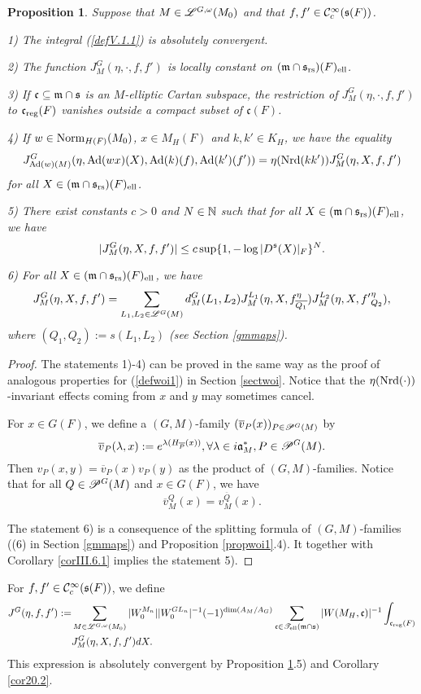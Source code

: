 \documentclass[a4paper]{amsart}
\newcommand{\fa}{{\mathfrak{a}}} \newcommand{\fb}{{\mathfrak{b}}}\newcommand{\fc}{{\mathfrak{c}}} \newcommand{\fd}{{\mathfrak{d}}}
\newcommand{\fm}{{\mathfrak{m}}} \newcommand{\fn}{{\mathfrak{n}}}\newcommand{\fo}{{\mathfrak{o}}} \newcommand{\fp}{{\mathfrak{p}}}
\newcommand{\ov}{\overline}
\newtheorem{prop}[thm]{Proposition}
\theoremstyle{definition}
\theoremstyle{remark}
\numberwithin{equation}{subsection}
\begin{document}
\begin{prop}\label{propV.1.1}
Suppose that $M\in\mathscr{L}^{G,\omega}(M_0)$ and that $f,f'\in{\mathcal {C}}_c^\infty({\mathfrak{s}}(F))$. 

1) The integral (\ref{defV.1.1}) is absolutely convergent. 

2) The function $J_M^G(\eta, \cdot, f, f')$ is locally constant on $(\fm\cap\fs_\rs)(F)_\el$. 

3) If $\fc\subseteq\fm\cap\fs$ is an $M$-elliptic Cartan subspace, the restriction of $J_M^G(\eta, \cdot, f, f')$ to $\fc_\reg(F)$ vanishes outside a compact subset of $\fc(F)$. 

4) If $w\in {\mathrm{Norm}}_{H(F)}(M_0)$, $x\in M_H(F)$ and $k, k'\in K_H$, we have the equality
$$ J_{{\mathrm{Ad}}(w)(M)}^G(\eta, {\mathrm{Ad}}(wx)(X), {\mathrm{Ad}}(k)(f), {\mathrm{Ad}}(k')(f'))=\eta({\mathrm{Nrd}}(kk')) J_M^G(\eta, X, f, f') $$
for all $X\in(\fm\cap\fs_\rs)(F)_\el$. 

5) There exist constants $c>0$ and $N\in{\mathbb {N}}$ such that for all $X\in(\fm\cap\fs_\rs)(F)_\el$, we have
$$ |J_M^G(\eta, X, f, f')| \leq c \sup\{1, -\log |D^{\mathfrak{s}}(X)|_F\}^N. $$

6) For all $X\in(\fm\cap\fs_\rs)(F)_\el$, we have
$$ J_M^G(\eta, X, f, f')=\sum_{L_1,L_2\in\msl^G(M)} d_M^G(L_1,L_2) J_M^{L_1}(\eta,X,f_{\ov{Q_1}}^\eta) J_M^{L_2}(\eta,X,{f'}_{Q_2}^\eta), $$
where $(Q_1,Q_2):=s(L_1,L_2)$ (see Section \ref{gmmaps}). 
\end{prop}

\begin{proof}
The statements 1)-4) can be proved in the same way as the proof of analogous properties for (\ref{defwoi1}) in Section \ref{sectwoi}. Notice that the $\eta({\mathrm{Nrd}}(\cdot))$-invariant effects coming from $x$ and $y$ may sometimes cancel. 

For $x\in G(F)$, we define a $(G,M)$-family $(\ov{v}_P(x))_{P\in\msp^G(M)}$ by
$$ \ov{v}_P(\lambda, x):=e^{\lambda(H_{\ov{P}}(x))},\forall\lambda\in i\fa_M^\ast,P\in\msp^G(M). $$
Then $v_{P}(x,y)=\ov{v}_P(x)v_P(y)$ as the product of $(G,M)$-families. Notice that for all $Q\in\mathscr{P}^G(M)$ and $x\in G(F)$, we have
$$ \ov{v}_M^Q(x)=v_M^{\ov{Q}}(x). $$

The statement 6) is a consequence of the splitting formula of $(G,M)$-families ((6) in Section \ref{gmmaps}) and Proposition \ref{propwoi1}.4). It together with Corollary \ref{corIII.6.1} implies the statement 5). 
\end{proof}

For $f,f'\in{\mathcal {C}}_c^\infty({\mathfrak{s}}(F))$, we define
\begin{equation}\label{geomnoninvltf1}
\begin{split}
 J^G(\eta, f, f'):=&\sum_{M\in\msl^{G,\omega}(M_0)} |W_0^{M_n}| |W_0^{GL_n}|^{-1} (-1)^{\dim(A_M/A_G)} \sum_{\fc\in\mst_\el(\fm\cap\fs)} |W(M_H, \fc)|^{-1} \int_{\fc_\reg(F)} \\ 
&J_M^G(\eta, X, f, f') dX. 
\end{split}
\end{equation}
This expression is absolutely convergent by Proposition \ref{propV.1.1}.5) and Corollary \ref{cor20.2}. 
\end{document}
